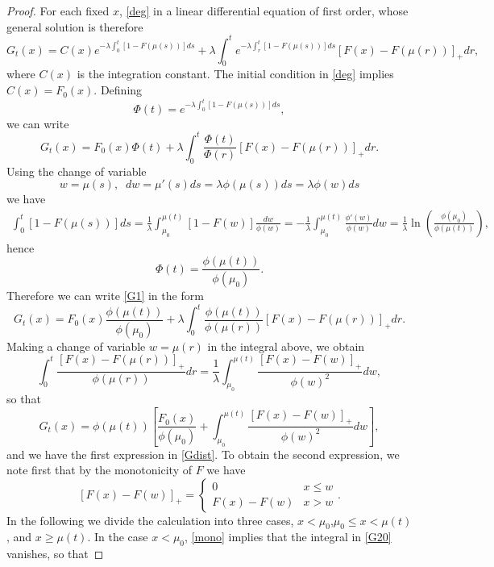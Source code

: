 \documentclass{article}
\numberwithin{equation}{section}
\begin{document}
\begin{proof}
	For each fixed $x$, \eqref{deg} in a linear differential equation of first order, whose general solution is therefore
	$$G_t(x)=C(x)e^{-\lambda \int_0^t[1-F(\mu(s))]ds}+\lambda \int_0^t e^{-\lambda \int_r^t[1-F(\mu(s))]ds} [F(x)-F(\mu(r))]_+dr,$$
	where $C(x)$ is the integration constant.
	The initial condition in \eqref{deg} implies 
	$C(x)=F_0(x)$. Defining 
	$$\Phi(t)=e^{-\lambda \int_{0}^t[1-F(\mu(s))]ds},$$
	we can write 
	\begin{equation}\label{G1}G_t(x)=F_0(x)\Phi(t)+\lambda \int_0^t \frac{\Phi(t)}{\Phi(r)} [F(x)-F(\mu(r))]_+dr.\end{equation}
	Using the change of variable
	$$w=\mu(s),\;\;dw=\mu'(s)ds=\lambda \phi(\mu(s))ds=\lambda \phi(w)ds$$
	we have
	\begin{align}\label{ii}
		\int_{0}^t[1-F(\mu(s))]ds=\frac{1}{\lambda}\int_{\mu_0}^{\mu(t)}[1-F(w)]\frac{dw}{\phi(w)}=-\frac{1}{\lambda}\int_{\mu_0}^{\mu(t)}\frac{\phi'(w)}{\phi(w)}dw=\frac{1}{\lambda}\ln\left( \frac{\phi(\mu_0)}{\phi(\mu(t))}\right),
	\end{align}
	hence 
	$$\Phi(t)=\frac{\phi(\mu(t))}{\phi(\mu_0)}.$$
	Therefore we can write \eqref{G1} in the form
	\begin{equation}\label{G20}G_t(x)=F_0(x)\frac{\phi(\mu(t))}{\phi(\mu_0)}+\lambda \int_0^t \frac{\phi(\mu(t))}{\phi(\mu(r))} [F(x)-F(\mu(r))]_+dr.\end{equation}
	Making a change of variable $w=\mu(r)$ in
	the integral above, we obtain
	$$\int_0^t \frac{[F(x)-F(\mu(r))]_+}{\phi(\mu(r))} dr=\frac{1}{\lambda}\int_{\mu_0}^{\mu(t)} \frac{[F(x)-F(w)]_+}{\phi(w)^2} dw,$$
	so that
	\begin{equation}\label{G2}G_t(x)=\phi(\mu(t))\left[ \frac{F_0(x)}{\phi(\mu_0)}+\int_{\mu_0}^{\mu(t)} \frac{[F(x)-F(w)]_+}{\phi(w)^2} dw\right],\end{equation}
	and we have the first expression in \eqref{Gdist}.
	To obtain the second expression, we 
	note first that by the monotonicity of $F$
	we have
	\begin{equation}\label{mono}
		[F(x)-F(w)]_+=\begin{cases}
			0 & x\leq w\\
			F(x)-F(w) & x>w
		\end{cases}.
	\end{equation}
	In the following we divide the calculation into three cases, $x<\mu_0$,$\mu_0\leq x<\mu(t)$, and $x\geq \mu(t)$.
	In the case $x<\mu_0$, \eqref{mono} implies that the integral in \eqref{G20} vanishes, so that 

\end{proof}
\end{document}
